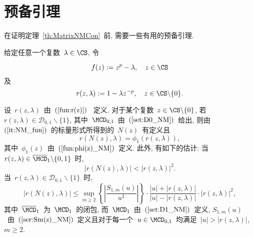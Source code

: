 




\section{预备引理}

在证明定理~\ref{th:MatrixNMCon}~前, 需要一些有用的预备引理.

给定任意一个复数~$\lambda \in \CS$, 令

\begin{equation}
\label{fun:f(z)} f(z) := z^p - \lambda, \ \ \ z \in \CS
\end{equation}
及
\begin{equation}
\label{fun:r(z)} r(z,\lambda) := 1 - \lambda z^{-p}, \ \ \ z \in
\CS\backslash\{0\}.
\end{equation}

\begin{lemma}
\label{lem:NM_r(N(z))_r(z)} 设~$r(z,\lambda)$~由~$(\ref{fun:r(z)})$~
定义. 对于某个复数~$z \in \CS\backslash\{0\}$, 若~$r(z,\lambda) \in
\mathcal {D}_{0,1}\backslash\{1\}$,
其中~$\MCD_{0,1}$~由~$(\ref{set:D0_NM})$~给出,
则由~$(\ref{it:NM_fun})$~的标量形式所得到的~$N(z)$~有定义且
\begin{equation}
\label{eq:r(N(z))_1} r(N(z),\lambda) = \phi_1(r(z,\lambda)),
\end{equation}
其中~$\phi_1(z)$~由~$(\ref{fun:phi(z)_NM})$~定义. 此外,
有如下的估计: 当~$r(z,\lambda) \in
\overline{\MCD}_1\backslash\{0,1\}$~时,
\begin{equation}
\label{ineq:abs_r(N(z))_1} |r(N(z),\lambda)| < |r(z,\lambda)|^2.
\end{equation}
当~$r(z,\lambda) \in \mathcal {D}_{0,1}\backslash\{1\}$~时,
\begin{equation}
\label{ineq:abs_r(N(z))_2} |r(N(z),\lambda)| \leq \sup_{m \geq
2}\left\{\left|\frac{S_{1,m}(u)}{u^2}\right|\right\}\cdot \frac{|u|
+ |r(z,\lambda)|}{|u| - |r(z,\lambda)|} \cdot |r(z,\lambda)|^2,
\end{equation}
其中~$\overline{\MCD}_1$~为~$\MCD_1$~的闭包,
而~$\MCD_1$~由~$(\ref{set:D1_NM})$~定义,
$S_{1,m}(u)$~由~$(\ref{ser:Sm(z)_NM})$~定义且对于每一个~$u \in
\MCD_{0,1}$~均满足~$|u| > |r(z,\lambda)|$, $m \geq 2$.
\end{lemma}

